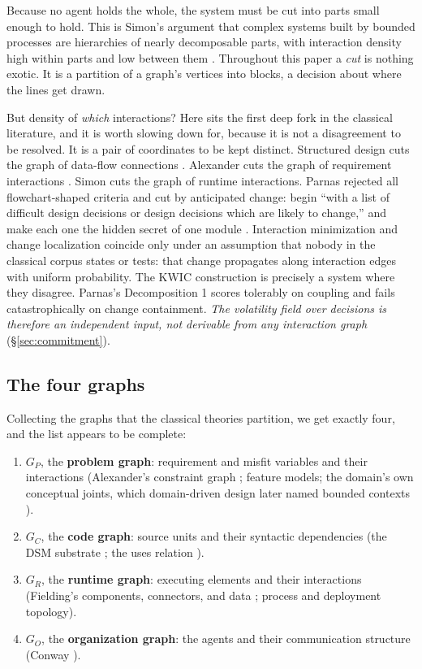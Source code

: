 \documentclass[11pt,oneside]{article}
\theoremstyle{definition}
\begin{document}
Because no agent holds the whole, the system must be cut into parts small enough to hold. This
is Simon's argument that complex systems built by bounded processes are hierarchies of nearly
decomposable parts, with interaction density high within parts and low between them
\cite{simon1962,simonando1961}. Throughout this paper a \emph{cut} is nothing exotic. It is a
partition of a graph's vertices into blocks, a decision about where the lines get drawn.

But density of \emph{which} interactions? Here sits the first deep fork in the classical
literature, and it is worth slowing down for, because it is not a disagreement to be resolved.
It is a pair of coordinates to be kept distinct. Structured design cuts the graph of data-flow
connections \cite{stevens1974}. Alexander cuts the graph of requirement interactions
\cite{alexander1964}. Simon cuts the graph of runtime interactions. Parnas rejected all
flowchart-shaped criteria and cut by anticipated change: begin ``with a list of difficult design
decisions or design decisions which are likely to change,'' and make each one the hidden secret
of one module \cite{parnas1972}. Interaction minimization and change localization coincide only
under an assumption that nobody in the classical corpus states or tests: that change propagates
along interaction edges with uniform probability. The KWIC construction is precisely a system
where they disagree. Parnas's Decomposition 1 scores tolerably on coupling and fails
catastrophically on change containment. \emph{The volatility field over decisions is therefore
an independent input, not derivable from any interaction graph} (\S\ref{sec:commitment}).

\subsection{The four graphs}\label{sec:fourgraphs}

Collecting the graphs that the classical theories partition, we get exactly four, and the list
appears to be complete:

\begin{enumerate}[leftmargin=1.6em]
\item $G_P$, the \textbf{problem graph}: requirement and misfit variables and their interactions
(Alexander's constraint graph \cite{alexander1964}; feature models; the domain's own conceptual
joints, which domain-driven design later named bounded contexts \cite{evans2003}).
\item $G_C$, the \textbf{code graph}: source units and their syntactic dependencies (the DSM
substrate \cite{steward1981,maccormack2006}; the uses relation \cite{parnas1979}).
\item $G_R$, the \textbf{runtime graph}: executing elements and their interactions (Fielding's
components, connectors, and data \cite{fielding2000}; process and deployment topology).
\item $G_O$, the \textbf{organization graph}: the agents and their communication structure
(Conway \cite{conway1968}).
\end{enumerate}
\end{document}
